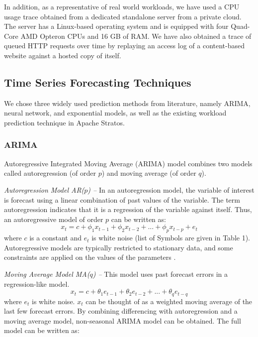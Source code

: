 In addition, as a representative of real world workloads, we have used a CPU usage trace obtained from a dedicated standalone server from a private cloud. The server has a Linux-based operating system and is equipped with four Quad-Core AMD Opteron CPUs and 16 GB of RAM. We have also obtained a trace of queued HTTP requests over time by replaying an access log of a content-based website against a hosted copy of itself.

\subsection{Time Series Forecasting Techniques}
We chose three widely used prediction methods from literature, namely ARIMA, neural network, and exponential models, as well as the existing workload prediction technique in Apache Stratos.

\subsubsection{ARIMA}
Autoregressive Integrated Moving Average (ARIMA) model combines two models called autoregression (of order $p$) and moving average (of order $q$).

\noindent
\textit{Autoregression Model AR($p$) --}
In an autoregression model, the variable of interest is forecast using a linear combination of past values of the variable. The term autoregression indicates that it is a regression of the variable against itself. Thus, an autoregressive model of order $p$ can be written as:
\begin{equation}
x_t = c + \phi_1x_{ t-1} + \phi_2x_{t-2} +...+ \phi_px_{t-p} + e_{t}
\end{equation}
where $c$ is a constant and $e_t$ is white noise (list of Symbols are given in Table 1). Autoregressive models are typically restricted to stationary data, and some constraints are applied on the values of the parameters \cite{Forecasting_OTexts}.

\noindent
\textit{Moving Average Model MA($q$) --}
This model uses past forecast errors in a regression-like model.
\begin{equation}
x_t = c + \theta_1e_{ t-1} + \theta_2e_{t-2} +...+ \theta_qe_{t-q}
\end{equation}
where $e_t$ is white noise. $x_t$ can be thought of as a weighted moving average of the last few forecast errors. 
By combining differencing with autoregression and a moving average model, non-seasonal ARIMA model can be obtained. The full model can be written as:

